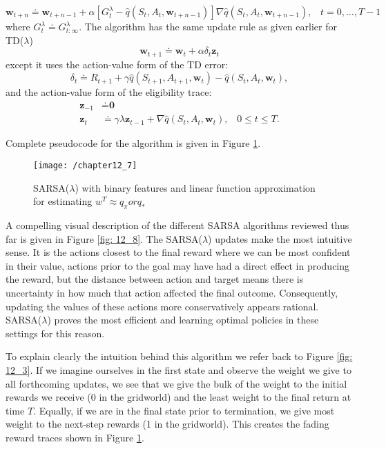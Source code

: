\begin{equation}
\textbf{w}_{t+n} \doteq \textbf{w}_{t+n-1} + \alpha \left[G_{t}^\lambda - \hat{q} (S_t, A_t, \textbf{w}_{t+n-1})\right] \nabla \hat{q}(S_t, A_t, \textbf{w}_{t+n-1}), \; \; \; t=0, \ldots, T-1
\end{equation}
where $G_{t}^\lambda \doteq G_{t: \infty}^\lambda$.  The algorithm has the same update rule as given earlier for TD($\lambda$)
\begin{equation}
\textbf{w}_{t+1} \doteq \textbf{w}_t + \alpha \delta_t \textbf{z}_t
\end{equation}
except it uses the action-value form of the TD error:
\begin{equation}
\delta_t \doteq R_{t+1} + \gamma \hat{q}(S_{t+1}, A_{t+1}, \textbf{w}_t) - \hat{q}(S_t, A_{t}, \textbf{w}_t),
\end{equation}
and the action-value form of the eligibility trace:
\begin{align} \label{z}
\textbf{z}_{-1} &\doteq \textbf{0} \\
\textbf{z}_t &\doteq \gamma \lambda \textbf{z}_{t-1} + \nabla \hat{q}(S_t, A_{t}, \textbf{w}_t), \; \; \; 0 \leq t \leq T.
\end{align}

Complete pseudocode for the algorithm is given in Figure \ref{fig: 12_7}.

\begin{figure}
	\centering
	\texttt{[image: /chapter12\_7]}
	\caption{SARSA($\lambda$) with binary features and linear function approximation for estimating $w^T \approx q_\pi or q_*$}
	\label{fig: 12_7}
\end{figure}

A compelling visual description of the different SARSA algorithms reviewed thus far is given in Figure \ref{fig: 12_8}. The SARSA($\lambda$) updates make the most intuitive sense. It is the actions closest to the final reward where we can be most confident in their value, actions prior to the goal may have had a direct effect in producing the reward, but the distance between action and target means there is uncertainty in how much that action affected the final outcome. Consequently, updating the values of these actions more conservatively appears rational. SARSA($\lambda$) proves the most efficient and learning optimal policies in these settings for this reason.

To explain clearly the intuition behind this algorithm we refer back to Figure \ref{fig: 12_3}. If we imagine ourselves in the first state and observe the weight we give to all forthcoming updates, we see that we give the bulk of the weight to the initial rewards we receive (0 in the gridworld) and the least weight to the final return at time $T$. Equally, if we are in the final state prior to termination, we give most weight to the next-step rewards (1 in the gridworld). This creates the fading reward traces shown in Figure \ref{fig: 12_7}.

